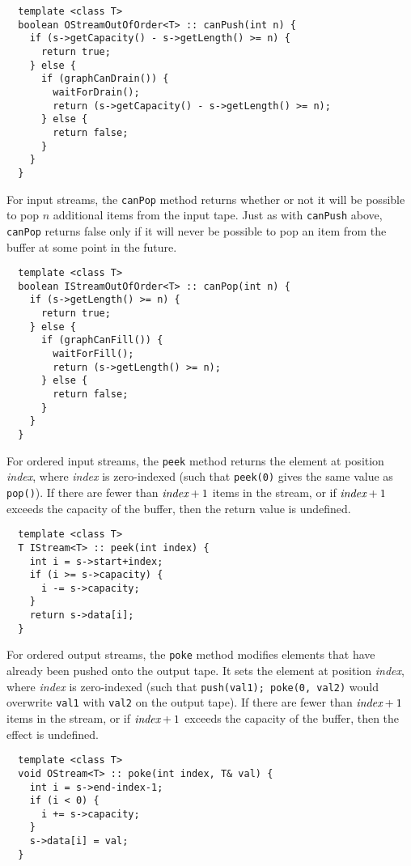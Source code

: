 {\small
\begin{verbatim}
  template <class T>
  boolean OStreamOutOfOrder<T> :: canPush(int n) {
    if (s->getCapacity() - s->getLength() >= n) {
      return true;
    } else {
      if (graphCanDrain()) {
        waitForDrain();
        return (s->getCapacity() - s->getLength() >= n);
      } else {
        return false;
      }
    }
  }
\end{verbatim}}

 For input streams, the {\tt canPop} method returns
whether or not it will be possible to pop $n$ additional items from
the input tape.  Just as with {\tt canPush} above, {\tt canPop}
returns false only if it will never be possible to pop an item from
the buffer at some point in the future.

{\small
\begin{verbatim}
  template <class T>
  boolean IStreamOutOfOrder<T> :: canPop(int n) {
    if (s->getLength() >= n) {
      return true;
    } else {
      if (graphCanFill()) {
        waitForFill();
        return (s->getLength() >= n);
      } else {
        return false;
      }
    }
  }
\end{verbatim}}

 For ordered input streams, the {\tt peek} method returns
the element at position {\it index}, where {\it index} is zero-indexed
(such that {\tt peek(0)} gives the same value as {\tt pop()}).  If
there are fewer than $\mbox{\it index}+1$ items in the stream, or if
$\mbox{\it index}+1$ exceeds the capacity of the buffer, then the return
value is undefined.

{\small
\begin{verbatim}
  template <class T>
  T IStream<T> :: peek(int index) {
    int i = s->start+index;
    if (i >= s->capacity) {
      i -= s->capacity;
    }
    return s->data[i];
  }
\end{verbatim}}

 For ordered output streams, the {\tt poke} method modifies
elements that have already been pushed onto the output tape.  It sets
the element at position {\it index}, where {\it index} is zero-indexed
(such that {\tt push(val1); poke(0, val2)} would overwrite {\tt val1}
with {\tt val2} on the output tape).  If there are fewer than
$\mbox{\it index}+1$ items in the stream, or if $\mbox{\it index}+1$ exceeds the
capacity of the buffer, then the effect is undefined.

{\small
\begin{verbatim}
  template <class T>
  void OStream<T> :: poke(int index, T& val) {
    int i = s->end-index-1;
    if (i < 0) {
      i += s->capacity;
    }
    s->data[i] = val;
  }
\end{verbatim}}

